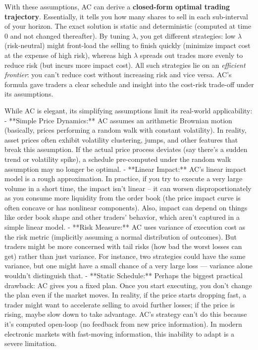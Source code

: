\documentclass[11pt]{article}
\begin{document}
	With these assumptions, AC can derive a \textbf{closed-form optimal trading trajectory}. Essentially, it tells you how many shares to sell in each sub-interval of your horizon. The exact solution is static and deterministic (computed at time 0 and not changed thereafter). By tuning $\lambda$, you get different strategies: low $\lambda$ (risk-neutral) might front-load the selling to finish quickly (minimize impact cost at the expense of high risk), whereas high $\lambda$ spreads out trades more evenly to reduce risk (but incurs more impact cost). All such strategies lie on an \textit{efficient frontier}: you can’t reduce cost without increasing risk and vice versa. AC’s formula gave traders a clear schedule and insight into the cost-risk trade-off under its assumptions.


	While AC is elegant, its simplifying assumptions limit its real-world applicability:
	- **Simple Price Dynamics:** AC assumes an arithmetic Brownian motion (basically, prices performing a random walk with constant volatility). In reality, asset prices often exhibit volatility clustering, jumps, and other features that break this assumption. If the actual price process deviates (say there’s a sudden trend or volatility spike), a schedule pre-computed under the random walk assumption may no longer be optimal.
	- **Linear Impact:** AC’s linear impact model is a rough approximation. In practice, if you try to execute a very large volume in a short time, the impact isn’t linear – it can worsen disproportionately as you consume more liquidity from the order book (the price impact curve is often concave or has nonlinear components). Also, impact can depend on things like order book shape and other traders’ behavior, which aren’t captured in a simple linear model.
	- **Risk Measure:** AC uses variance of execution cost as the risk metric (implicitly assuming a normal distribution of outcomes). But traders might be more concerned with tail risks (how bad the worst losses can get) rather than just variance. For instance, two strategies could have the same variance, but one might have a small chance of a very large loss — variance alone wouldn’t distinguish that.
	- **Static Schedule:** Perhaps the biggest practical drawback: AC gives you a fixed plan. Once you start executing, you don’t change the plan even if the market moves. In reality, if the price starts dropping fast, a trader might want to accelerate selling to avoid further losses; if the price is rising, maybe slow down to take advantage. AC’s strategy can’t do this because it’s computed open-loop (no feedback from new price information). In modern electronic markets with fast-moving information, this inability to adapt is a severe limitation.
	
\end{document}
